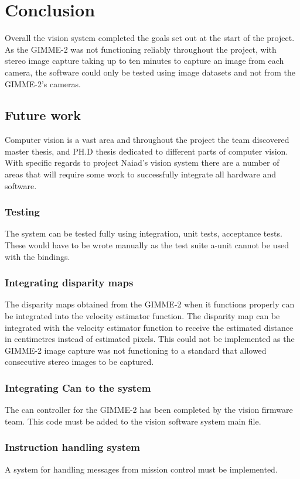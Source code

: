 \section{Conclusion}\label{sec:conclusion}
Overall the vision system completed the goals set out at the start of the project. As the GIMME-2 was not functioning reliably throughout the project, with stereo image capture taking up to ten minutes to capture an image from each camera, the software could only be tested using image datasets and not from the GIMME-2's cameras. 
\subsection{Future work}
Computer vision is a vast area and throughout the project the team discovered master thesis, and PH.D thesis dedicated to different parts of computer vision. With specific regards to project Naiad's vision system there are a number of areas that will require some work to successfully integrate all hardware and software.
\subsubsection{Testing}
The system can be tested fully using integration, unit tests, acceptance tests. These would have to be wrote manually as the test suite a-unit cannot be used with the bindings.

\subsubsection{Integrating disparity maps}
The disparity maps obtained from the GIMME-2 when it functions properly can be integrated into the velocity estimator function.
The disparity map can be integrated with the velocity estimator function to receive the estimated distance in centimetres instead of estimated pixels. This could not be implemented as the GIMME-2 image capture was not functioning to a standard that allowed consecutive stereo images to be captured.

\subsubsection{Integrating Can to the system}
The can controller for the GIMME-2 has been completed by the vision firmware team. This code must be added to the vision software system main file.

\subsubsection{Instruction handling system}
A system for handling messages from mission control must be implemented.

